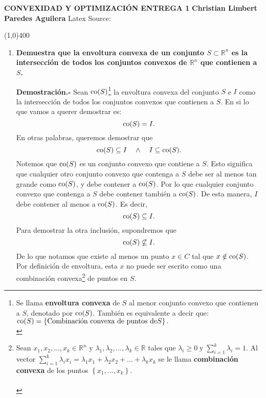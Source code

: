 \center \textbf{CONVEXIDAD Y OPTIMIZACIÓN}
\center \textbf{\Large ENTREGA 1}
\center \textbf{ \textbf{Christian Limbert Paredes Aguilera}}
\center Latex Source: \url{}

\line(1,0){400}



\begin{enumerate}

    \item \textbf{\boldmath Demuestra que la envoltura convexa de un conjunto $S\subset \mathbb{R}^n$ es la intersección de todos los conjuntos convexos de $\mathbb{R}^n$ que contienen a $S$.}

	\textbf{Demostración.-}\; Sean $\mathop{\mbox{\normalfont co}}\nolimits(S)$\footnote{
	Se llama \textbf{envoltura convexa} de $S$ al menor conjunto convexo que contienen a $S$, denotado por $\mathop{\mbox{\normalfont co}}\nolimits(S)$.
	También es equivalente a decir que:
	$\mathop{\mbox{\normalfont co}}\nolimits(S)=\left\{\mbox{Combinación convexa de puntos de} S\right\}.$\\
	\label{envoltura}}
	la envoltura convexa del conjunto $S$ e $I$ como la intersección de todos los conjuntos convexos que contienen a $S$. En si lo que vamos a querer demostrar es:
	$$\mathop{\mbox{\normalfont co}}\nolimits(S)=I.$$
	En otras palabras, queremos demostrar que
	$$\mathop{\mbox{\normalfont co}}\nolimits(S)\subseteq I \quad \land \quad I\subseteq \mathop{\mbox{\normalfont co}}\nolimits(S).$$
	Notemos que $\mathop{\mbox{\normalfont co}}\nolimits(S)$ es un conjunto convexo que contiene a $S$. Esto significa que cualquier otro conjunto convexo que contenga a $S$ debe ser al menos tan grande como $\mathop{\mbox{\normalfont co}}\nolimits(S)$, y debe contener a $\mathop{\mbox{\normalfont co}}\nolimits(S)$. Por lo que cualquier conjunto convexo que contenga a $S$ debe contener también a $\mathop{\mbox{\normalfont co}}\nolimits(S)$. De esta manera, $I$ debe contener al menos a $\mathop{\mbox{\normalfont co}}\nolimits(S)$. Es decir,
	$$\mathop{\mbox{\normalfont co}}\nolimits(S)\subseteq I.$$
	Para demostrar la otra inclusión, supondremos que 
	$$\mathop{\mbox{\normalfont co}}\nolimits(S)\not\subseteq I.$$
	De lo que notamos que existe al menos un punto $x\in C$ tal que $x\notin \mathop{\mbox{\normalfont co}}\nolimits(S)$. Por definición de envoltura, esta $x$ no puede ser escrito como una combinación convexa\footnote{
	Sean $x_1,x_2,\ldots,x_k\in \mathbb{R}^n$ y $\lambda_1,\lambda_2,\ldots,\lambda_k\in \mathbb{R}$ tales que 
	$\lambda_i\geq 0\; \text{y} \;\sum_{i=1}^{k}\lambda_i=1.$ 
	Al vector
	$\sum_{i=1}^{k}\lambda_ix_i=\lambda_1x_1+\lambda_2x_2+\ldots+\lambda_kx_k$
	se le llama \textbf{combinación convexa} de los puntos $\left\{x_1,\ldots,x_k\right\}$.\\\\
	} de puntos en $S$.


\end{enumerate}
